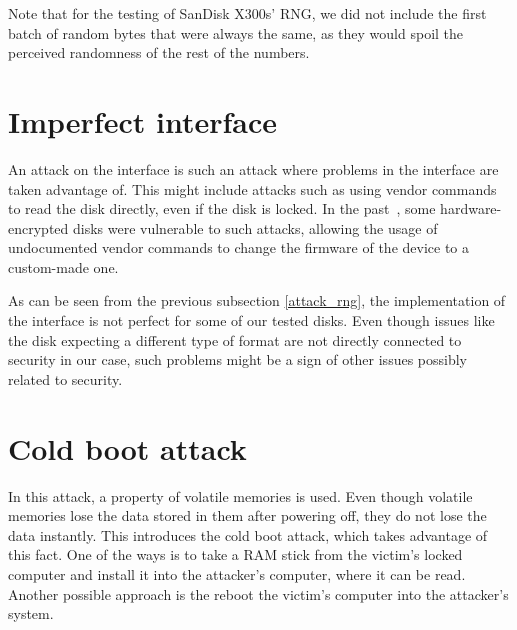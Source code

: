 Note that for the testing of SanDisk X300s' RNG, we did not include the first batch of random bytes that were always the same, as they would spoil the perceived randomness of the rest of the numbers.


\section{Imperfect interface}


An attack on the interface is such an attack where problems in the interface are taken advantage of.
This might include attacks such as using vendor commands to read the disk directly, even if the disk is locked. In the past~\cite{self_encrypting_deception}, some hardware-encrypted disks were vulnerable to such attacks, allowing the usage of undocumented vendor commands to change the firmware of the device to a custom-made one. %

As can be seen from the previous subsection \ref{attack_rng}, the implementation of the interface is not perfect for some of our tested disks. Even though issues like the disk expecting a different type of format are not directly connected to security in our case, such problems might be a sign of other issues possibly related to security.


\section{Cold boot attack}
\label{cold_boot_attack}

In this attack, a property of volatile memories is used. Even though volatile memories lose the data stored in them after powering off, they do not lose the data instantly. This introduces the cold boot attack, which takes advantage of this fact. One of the ways is to take a RAM stick from the victim's locked computer and install it into the attacker's computer, where it can be read. Another possible approach is the reboot the victim's computer into the attacker's system.

